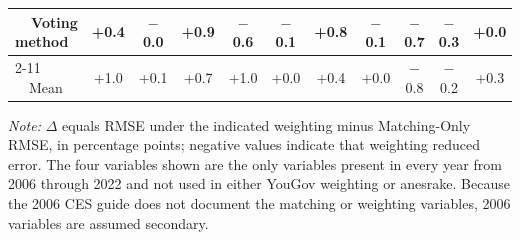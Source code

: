 \begin{table}[!htbp]
{\begin{threeparttable}
\begin{tabular}{lcccccccccc}
~~Voting method & +0.4 & $-$0.0 & +0.9 & $-$0.6 & $-$0.1 & +0.8 & $-$0.1 & $-$0.7 & $-$0.3 & +0.0 \\
\cmidrule(l){2-11}
~~Mean & +1.0 & +0.1 & +0.7 & +1.0 & +0.0 & +0.4 & +0.0 & $-$0.8 & $-$0.2 & +0.3 \\
\bottomrule
\end{tabular}
\begin{tablenotes}
\footnotesize
\item \textit{Note:} $\Delta$ equals RMSE under the indicated weighting minus Matching-Only RMSE, in percentage points; negative values indicate that weighting reduced error. The four variables shown are the only variables present in every year from 2006 through 2022 and not used in either YouGov weighting or anesrake. Because the 2006 CES guide does not document the matching or weighting variables, 2006 variables are assumed secondary.
\end{tablenotes}
\end{threeparttable}%
}
\end{table}